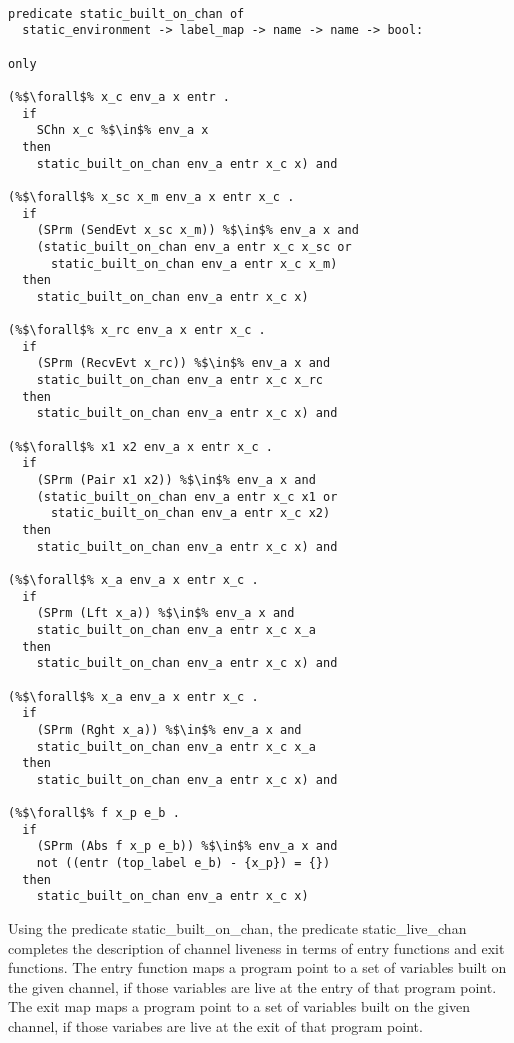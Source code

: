 \documentclass{article}
\begin{document}
\begin{lstlisting}[language=logic, style=codestyle1, escapechar=\%]

predicate static_built_on_chan of
  static_environment -> label_map -> name -> name -> bool:

only

(%$\forall$% x_c env_a x entr .
  if 
    SChn x_c %$\in$% env_a x 
  then 
    static_built_on_chan env_a entr x_c x) and

(%$\forall$% x_sc x_m env_a x entr x_c . 
  if
    (SPrm (SendEvt x_sc x_m)) %$\in$% env_a x and
    (static_built_on_chan env_a entr x_c x_sc or
      static_built_on_chan env_a entr x_c x_m)
  then 
    static_built_on_chan env_a entr x_c x)

(%$\forall$% x_rc env_a x entr x_c . 
  if  
    (SPrm (RecvEvt x_rc)) %$\in$% env_a x and
    static_built_on_chan env_a entr x_c x_rc
  then 
    static_built_on_chan env_a entr x_c x) and
  
(%$\forall$% x1 x2 env_a x entr x_c . 
  if  
    (SPrm (Pair x1 x2)) %$\in$% env_a x and
    (static_built_on_chan env_a entr x_c x1 or
      static_built_on_chan env_a entr x_c x2)
  then 
    static_built_on_chan env_a entr x_c x) and

(%$\forall$% x_a env_a x entr x_c .
  if
    (SPrm (Lft x_a)) %$\in$% env_a x and
    static_built_on_chan env_a entr x_c x_a
  then 
    static_built_on_chan env_a entr x_c x) and

(%$\forall$% x_a env_a x entr x_c .
  if
    (SPrm (Rght x_a)) %$\in$% env_a x and
    static_built_on_chan env_a entr x_c x_a
  then 
    static_built_on_chan env_a entr x_c x) and

(%$\forall$% f x_p e_b .
  if
    (SPrm (Abs f x_p e_b)) %$\in$% env_a x and
    not ((entr (top_label e_b) - {x_p}) = {})
  then
    static_built_on_chan env_a entr x_c x)

  \end{lstlisting}


Using the predicate static\_built\_on\_chan, the predicate static\_live\_chan completes the
description of channel liveness in terms of entry functions and exit functions. The entry
function maps a program point to a set of variables built on the given channel, if those
variables are live at the entry of that program point.  The exit map maps a program point to a
set of variables built on the given channel, if those variabes are live at the exit of that
program point.
\end{document}
